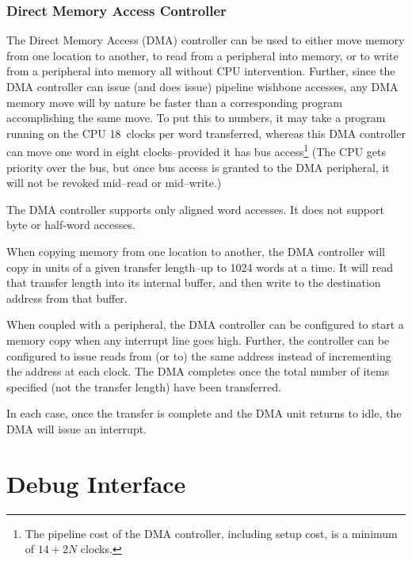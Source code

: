\documentclass{gqtekspec}
\begin{document}
\subsubsection{Direct Memory Access Controller}

The Direct Memory Access (DMA) controller can be used to either move memory
from one location to another, to read from a peripheral into memory, or to
write from a peripheral into memory all without CPU intervention.  Further,
since the DMA controller can issue (and does issue) pipeline wishbone accesses,
any DMA memory move will by nature be faster than a corresponding program
accomplishing the same move.  To put this to numbers, it may take a program
running on the CPU 18~clocks per word transferred, whereas this DMA controller
can move one word in eight clocks--provided it has bus
access\footnote{The pipeline cost of the DMA controller, including setup cost,
is a minimum of $14+2N$ clocks.} (The CPU gets priority over the bus, but once
bus access is granted to the DMA peripheral, it will not be revoked mid--read
or mid--write.)

The DMA controller supports only aligned word accesses.  It does not support
byte or half-word accesses.

When copying memory from one location to another, the DMA controller will
copy in units of a given transfer length--up to 1024 words at a time.  It will
read that transfer length into its internal buffer, and then write to the
destination address from that buffer.

When coupled with a peripheral, the DMA controller can be configured to start
a memory copy when any interrupt line goes high.  Further, the controller can
be configured to issue reads from (or to) the same address instead of
incrementing the address at each clock.  The DMA completes once the total
number of items specified (not the transfer length) have been transferred.

In each case, once the transfer is complete and the DMA unit returns to
idle, the DMA will issue an interrupt.


\section{Debug Interface}\label{sec:debug}
\end{document}
